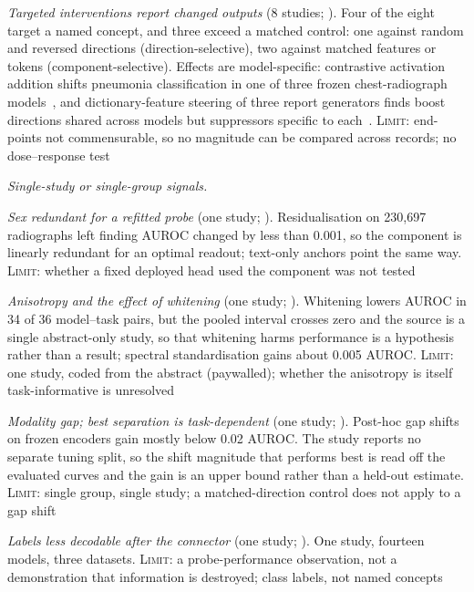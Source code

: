 \begin{description}[leftmargin=1.35em,labelsep=0.4em,itemsep=2pt,topsep=2pt,parsep=0pt]
\item[\textbf{F9a}] \emph{Targeted interventions report changed outputs} (8 studies; \cite{bouzid2025insights,chen2026vihd,farina2026translating,nooralahzadeh2026sparse,nooralahzadeh2026universal,sadanandan2026mechanistically,sadashivaiah2024explaining,zeng2026easylens}). Four of the eight target a named concept, and three exceed a matched control: one against random and reversed directions (direction-selective), two against matched features or tokens (component-selective). Effects are model-specific: contrastive activation addition shifts pneumonia classification in one of three frozen chest-radiograph models~\cite{farina2026translating}, and dictionary-feature steering of three report generators finds boost directions shared across models but suppressors specific to each~\cite{nooralahzadeh2026universal}. \textsc{Limit:} end-points not commensurable, so no magnitude can be compared across records; no dose--response test
\end{description}
\par\smallskip\noindent\textit{Single-study or single-group signals.}
\begin{description}[leftmargin=1.35em,labelsep=0.4em,itemsep=2pt,topsep=2pt,parsep=0pt]
\item[\textbf{F4}] \emph{Sex redundant for a refitted probe} (one study; \cite{kim2026encoding}). Residualisation on 230,697 radiographs left finding AUROC changed by less than 0.001, so the component is linearly redundant for an optimal readout; text-only anchors point the same way. \textsc{Limit:} whether a fixed deployed head used the component was not tested
\item[\textbf{F5}] \emph{Anisotropy and the effect of whitening} (one study; \cite{garciahidalgo2026embedding}). Whitening lowers AUROC in 34 of 36 model--task pairs, but the pooled interval crosses zero and the source is a single abstract-only study, so that whitening harms performance is a hypothesis rather than a result; spectral standardisation gains about 0.005 AUROC. \textsc{Limit:} one study, coded from the abstract (paywalled); whether the anisotropy is itself task-informative is unresolved
\item[\textbf{F6}] \emph{Modality gap; best separation is task-dependent} (one study; \cite{restrepo2026cone}). Post-hoc gap shifts on frozen encoders gain mostly below 0.02 AUROC. The study reports no separate tuning split, so the shift magnitude that performs best is read off the evaluated curves and the gain is an upper bound rather than a held-out estimate. \textsc{Limit:} single group, single study; a matched-direction control does not apply to a gap shift
\item[\textbf{F8b}] \emph{Labels less decodable after the connector} (one study; \cite{zhu2026lost}). One study, fourteen models, three datasets. \textsc{Limit:} a probe-performance observation, not a demonstration that information is destroyed; class labels, not named concepts
\end{description}
